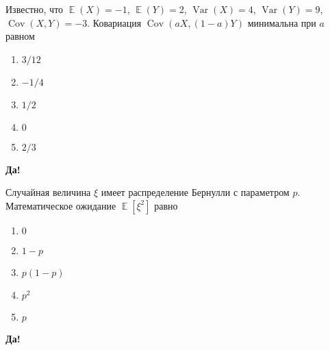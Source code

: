 \documentclass[t]{beamer}
\DeclareMathOperator{\Var}{Var}
\DeclareMathOperator{\Cov}{Cov}
\DeclareMathOperator{\E}{\mathbb{E}}
\begin{document}
 \begin{frame} \label{24-Yes} 
\begin{block}{24} 

Известно, что $\E(X)=-1$, $\E(Y)=2$, $\Var(X)=4$, $\Var(Y)=9$, $\Cov(X,Y)=-3$. Ковариация $\Cov(aX, (1-a)Y)$ минимальна при $a$ равном


 \end{block} 
\begin{enumerate} 
\item[] \hyperlink{24-No}{\beamergotobutton{}  $3/12$ }
\item[] \hyperlink{24-No}{\beamergotobutton{}  $-1/4$ }
\item[] \hyperlink{24-Yes}{\beamergotobutton{}  $1/2$ }
\item[] \hyperlink{24-No}{\beamergotobutton{}  $0$ }
\item[] \hyperlink{24-No}{\beamergotobutton{}  $2/3$ }
\end{enumerate} 

 \textbf{Да!} 
 \hyperlink{25}{}\end{frame} 


 \begin{frame} \label{25-Yes} 
\begin{block}{25} 

Случайная величина $\xi$ имеет распределение Бернулли с параметром $p$. Математическое ожидание $\E[\xi^2]$ равно
  


 \end{block} 
\begin{enumerate} 
\item[] \hyperlink{25-No}{\beamergotobutton{} $0$}
\item[] \hyperlink{25-No}{\beamergotobutton{} $1-p$}
\item[] \hyperlink{25-No}{\beamergotobutton{} $p(1-p)$}
\item[] \hyperlink{25-No}{\beamergotobutton{} $p^2$}
\item[] \hyperlink{25-Yes}{\beamergotobutton{} $p$}
\end{enumerate} 

 \textbf{Да!} 
 \hyperlink{26}{}\end{frame} 
\end{document}
